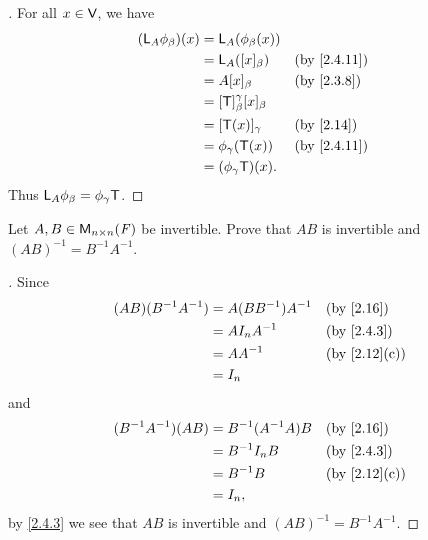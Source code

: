 \begin{proof}[]
	For all \(x \in \mathsf{V}\), we have
	\begin{align*}
		(\L_A \phi_{\beta})(x) & = \L_A(\phi_{\beta}(x))                              \\
		                       & = \L_A([x]_{\beta})                 &  & \by{2.4.11} \\
		                       & = A [x]_{\beta}                     &  & \by{2.3.8}  \\
		                       & = [\T]_{\beta}^{\gamma} [x]_{\beta}                  \\
		                       & = [\T(x)]_{\gamma}                  &  & \by{2.14}   \\
		                       & = \phi_{\gamma}(\T(x))              &  & \by{2.4.11} \\
		                       & = (\phi_{\gamma} \T)(x).
	\end{align*}
	Thus \(\mathsf{L}_A \phi_{\beta} = \phi_{\gamma} \mathsf{T}\).
\end{proof}

\exercisesection

\setcounter{ex}{3}
\begin{ex}\label{ex:2.4.4}
	Let \(A, B \in \mathsf{M}_{{n} \times n}({\mathit{F}})\) be invertible.
	Prove that \(AB\) is invertible and \((AB)^{-1} = B^{-1} A^{-1}\).
\end{ex}

\begin{proof}[]
	Since
	\begin{align*}
		(AB) (B^{-1} A^{-1}) & = A (B B^{-1}) A^{-1} &  & \by{2.16}    \\
		                     & = A I_n A^{-1}        &  & \by{2.4.3}   \\
		                     & = A A^{-1}            &  & \by{2.12}[c] \\
		                     & = I_n
	\end{align*}
	and
	\begin{align*}
		(B^{-1} A^{-1}) (AB) & = B^{-1} (A^{-1} A) B &  & \by{2.16}    \\
		                     & = B^{-1} I_n B        &  & \by{2.4.3}   \\
		                     & = B^{-1} B            &  & \by{2.12}[c] \\
		                     & = I_n,
	\end{align*}
	by \cref{2.4.3} we see that \(AB\) is invertible and \((AB)^{-1} = B^{-1} A^{-1}\).
\end{proof}

